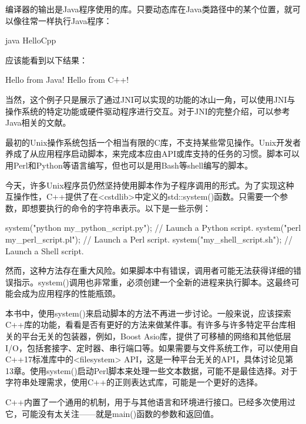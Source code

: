 编译器的输出是Java程序使用的库。只要动态库在Java类路径中的某个位置，就可以像往常一样执行Java程序：

\begin{shell}
java HelloCpp
\end{shell}

应该能看到以下结果：

\begin{shell}
Hello from Java!
Hello from C++!
\end{shell}

当然，这个例子只是展示了通过JNI可以实现的功能的冰山一角，可以使用JNI与操作系统的特定功能或硬件驱动程序进行交互。对于JNI的完整介绍，可以参考Java相关的文献。


最初的Unix操作系统包括一个相当有限的C库，不支持某些常见操作。Unix开发者养成了从应用程序启动脚本，来完成本应由API或库支持的任务的习惯。脚本可以用Perl和Python等语言编写，但也可以是用Bash等shell编写的脚本。

今天，许多Unix程序员仍然坚持使用脚本作为子程序调用的形式。为了实现这种互操作性，C++提供了在<cstdlib>中定义的std::system()函数。只需要一个参数，即想要执行的命令的字符串表示。以下是一些示例：

\begin{cpp}
system("python my_python_script.py"); // Launch a Python script.
system("perl my_perl_script.pl"); // Launch a Perl script.
system("my_shell_script.sh"); // Launch a Shell script.
\end{cpp}

然而，这种方法存在重大风险。如果脚本中有错误，调用者可能无法获得详细的错误指示。system()调用也非常重，必须创建一个全新的进程来执行脚本。这最终可能会成为应用程序的性能瓶颈。

本书中，使用system()来启动脚本的方法不再进一步讨论。一般来说，应该探索C++库的功能，看看是否有更好的方法来做某件事。有许多与许多特定平台库相关的平台无关的包装器，例如，Boost Asio库，提供了可移植的网络和其他低层I/O，包括套接字、定时器、串行端口等。如果需要与文件系统工作，可以使用自C++17标准库中的<filesystem> API，这是一种平台无关的API，具体讨论见第13章。使用system()启动Perl脚本来处理一些文本数据，可能不是最佳选择。对于字符串处理需求，使用C++的正则表达式库，可能是一个更好的选择。


C++内置了一个通用的机制，用于与其他语言和环境进行接口。已经多次使用过它，可能没有太关注——就是main()函数的参数和返回值。

